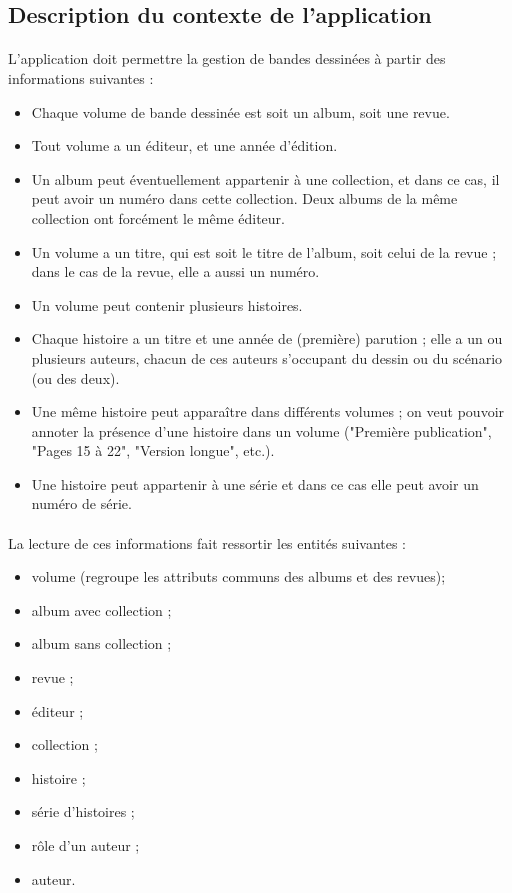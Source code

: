 \documentclass[12pt]{article}
\begin{document}
\subsection{Description du contexte de l'application}

\paragraph{}
L'application doit permettre la gestion de bandes dessinées à partir des
informations suivantes :

\begin{itemize}
	\item Chaque volume de bande dessinée est soit un album, soit une revue.
	\item Tout volume a un éditeur, et une année d’édition.
	\item Un album peut éventuellement appartenir à une collection, et dans ce cas, il
		peut avoir un numéro dans cette collection. Deux albums de la même collection
		ont forcément le même éditeur.
	\item Un volume a un titre, qui est soit le titre de l'album, soit celui de la
		revue ; dans le cas de la revue, elle a aussi un numéro.
	\item Un volume peut contenir plusieurs histoires.
	\item Chaque histoire a un titre et une année de (première) parution ; elle a un
		ou plusieurs auteurs, chacun de ces auteurs s’occupant du dessin ou du
		scénario (ou des deux).
	\item Une même histoire peut apparaître dans différents volumes ; on veut pouvoir
		annoter la présence d’une histoire dans un volume ("Première publication",
		"Pages 15 à 22", "Version longue", etc.).
	\item Une histoire peut appartenir à une série et dans ce cas elle peut avoir un
		numéro de série.
\end{itemize}

\paragraph{}
La lecture de ces informations fait ressortir les entités suivantes :
\begin{itemize}
	\item volume (regroupe les attributs communs des albums et des revues);
	\item album avec collection ;
	\item album sans collection ;
	\item revue ;
	\item éditeur ;
	\item collection ;
	\item histoire ;
	\item série d'histoires ;
	\item rôle d'un auteur ;
	\item auteur.
\end{itemize}
\end{document}

